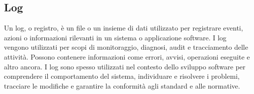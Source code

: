 \vspace{2em}
\subsection*{Log}
\par Un log, o registro, è un file o un insieme di dati utilizzato per registrare eventi, azioni o informazioni rilevanti in un sistema o applicazione software. I log vengono utilizzati per scopi di monitoraggio, diagnosi, audit e tracciamento delle attività. Possono contenere informazioni come errori, avvisi, operazioni eseguite e altro ancora. I log sono spesso utilizzati nel contesto dello sviluppo software per comprendere il comportamento del sistema, individuare e risolvere i problemi, tracciare le modifiche e garantire la conformità agli standard e alle normative.
